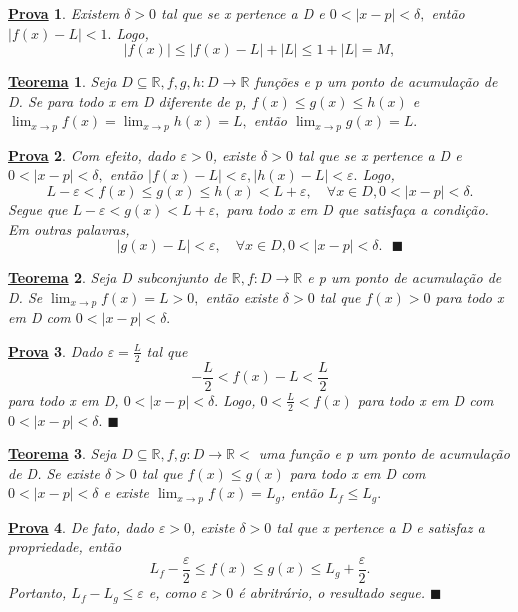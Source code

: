 \documentclass{article}
\newtheorem*{theorem*}{\underline{Teorema}}
\newtheorem*{proof*}{\underline{Prova}}
\renewcommand\qedsymbol{$\blacksquare$}
\begin{document}
\begin{proof*}
  Existem $\delta > 0$ tal que se x pertence a D e $0<|x-p|<\delta,$ ent\~ao $|f(x)-L|<1.$ Logo, 
    $$
      |f(x)| \leq{|f(x)-L| + |L|} \leq{1 + |L| = M},
    $$
\end{proof*}
\begin{theorem*}
  Seja $D\subseteq{\mathbb{R}}, f, g, h:D\rightarrow \mathbb{R}$ fun\c c\~oes e p um ponto de acumula\c c\~ao de D. Se
  para todo x em D diferente de p, $f(x)\leq{g(x)}\leq{h(x)}$ e $\lim_{x\to p}f(x) = \lim_{x\to p }h(x) = L,$ ent\~ao $\lim_{x\to p}g(x) = L.$
\end{theorem*}
\begin{proof*}
  Com efeito, dado $\varepsilon > 0$, existe $\delta > 0$ tal que se x pertence a D e $0 < |x-p| < \delta,$ ent\~ao
  $|f(x)-L|<\varepsilon, |h(x)-L|<\varepsilon.$ Logo, 
    $$
      L - \varepsilon < f(x) \leq{g(x)} \leq{h(x)} < L +\varepsilon, \quad \forall x\in D, 0<|x-p|<\delta.
    $$
  Segue que $L-\varepsilon < g(x) < L+\varepsilon,$ para todo x em D que satisfa\c ca a condi\c c\~ao. Em outras palavras, 
    $$
    |g(x)-L| < \varepsilon, \quad \forall x\in D, 0<|x-p|<\delta.\text{ \qedsymbol}
    $$
\end{proof*}
\begin{theorem*}
  Seja D subconjunto de $\mathbb{R}, f:D\rightarrow \mathbb{R}$ e p um ponto de acumula\c c\~ao de D. Se $\lim_{x\to p}f(x) = L > 0,$
  ent\~ao existe $\delta > 0$ tal que $f(x) > 0$ para todo x em D com $0<|x-p|<\delta.$
\end{theorem*}
\begin{proof*}
  Dado $\varepsilon = \frac{L}{2}$ tal que 
  $$
    -\frac{L}{2} < f(x) - L < \frac{L}{2}
  $$
  para todo x em D, $0 < |x-p|<\delta.$ Logo, $0 <\frac{L}{2}<f(x)$ para todo x em D com $0 <|x-p|<\delta.$ \qedsymbol
\end{proof*}
\begin{theorem*}
  Seja $D\subseteq{\mathbb{R}}, f, g:D\rightarrow \mathbb{R}<$ uma fun\c c\~ao e p um ponto de acumula\c c\~ao de D. Se existe $\delta > 0$
  tal que $f(x)\leq{g(x)}$ para todo x em D com $0 <|x-p|<\delta$ e existe $\lim_{x\to p}f(x) = L_{g}$, ent\~ao $L_{f}\leq{L_{g}}.$
\end{theorem*}
\begin{proof*}
  De fato, dado $\varepsilon > 0$, existe $\delta > 0$ tal que x pertence a D e satisfaz a propriedade, ent\~ao 
    $$
      L_{f} - \frac{\varepsilon}{2} \leq{f(x)}\leq{g(x)}\leq{L_{g}+\frac{\varepsilon}{2}.}
    $$
    Portanto, $L_{f}-L_{g}\leq{\varepsilon}$ e, como $\varepsilon > 0$ \'e abritr\'ario, o resultado segue. \qedsymbol
\end{proof*}
\end{document}
